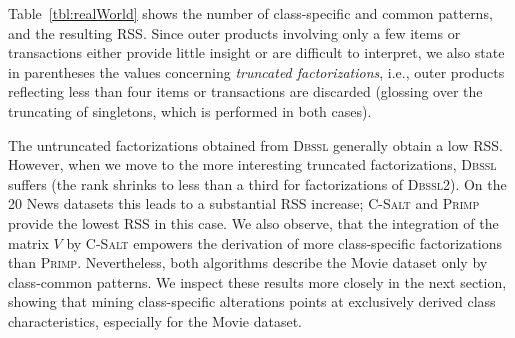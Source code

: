 Table~\ref{tbl:realWorld} shows the number of class-specific and common patterns, and the resulting RSS. Since outer products involving only a few items or transactions either provide little insight or are difficult to interpret, we also state in parentheses the values concerning \textit{truncated factorizations}, i.e., outer products reflecting less than four items or transactions are discarded (glossing over the truncating of singletons, which is performed in both cases).

The untruncated factorizations obtained from \textsc{Dbssl} generally obtain a low RSS. However, when we move to the more interesting truncated factorizations, \textsc{Dbssl} suffers (the rank shrinks to less than a third for factorizations of \textsc{Dbssl2}). On the 20 News datasets this leads to a substantial RSS increase; \textsc{C-Salt} and \textsc{Primp} provide the lowest RSS in this case. We also observe, that the integration of the matrix $V$ by \textsc{C-Salt} empowers the derivation of more class-specific factorizations than \textsc{Primp}. Nevertheless, both algorithms describe the Movie dataset only by class-common patterns. We inspect these results more closely in the next section, showing that mining class-specific alterations points at exclusively derived class characteristics, especially for the Movie dataset.  

